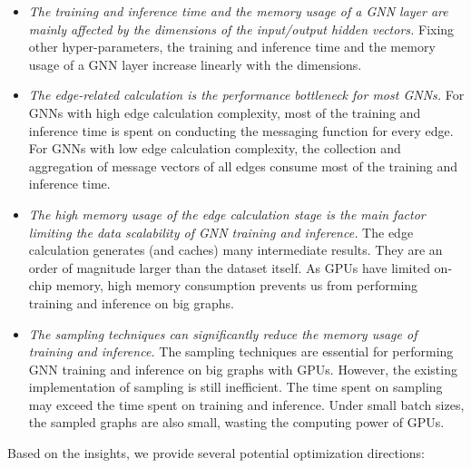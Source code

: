 \begin{itemize}
    \item \emph{The training and inference time and the memory usage of a GNN layer are mainly affected by the dimensions of the input/output hidden vectors.}
    Fixing other hyper-parameters, the training and inference time and the memory usage of a GNN layer increase linearly with the dimensions.
    
    \item \emph{The edge-related calculation is the performance bottleneck for most GNNs.}
    For GNNs with high edge calculation complexity, most of the training and inference time is spent on conducting the messaging function for every edge.
    For GNNs with low edge calculation complexity, the collection and aggregation of message vectors of all edges consume most of the training and inference time.
    
    \item \emph{The high memory usage of the edge calculation stage is the main factor limiting the data scalability of GNN training and inference.}
    The edge calculation generates (and caches) many intermediate results.
    They are an order of magnitude larger than the dataset itself.
    As GPUs have limited on-chip memory, high memory consumption prevents us from performing training and inference on big graphs.
    
    \item \emph{The sampling techniques can significantly reduce the memory usage of training and inference.}
    The sampling techniques are essential for performing GNN training and inference on big graphs with GPUs.
    However, the existing implementation of sampling is still inefficient.
    The time spent on sampling may exceed the time spent on training and inference.
    Under small batch sizes, the sampled graphs are also small, wasting the computing power of GPUs.
\end{itemize}

Based on the insights, we provide several potential optimization directions:

